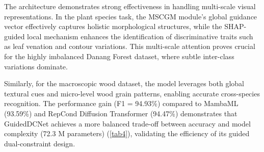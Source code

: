 \documentclass[a4paper,fleqn]{cas-sc}
\begin{document}
The architecture demonstrates strong effectiveness in handling multi-scale visual representations. In the plant species task, the MSCGM module’s global guidance vector effectively captures holistic morphological structures, while the SHAP-guided local mechanism enhances the identification of discriminative traits such as leaf venation and contour variations. This multi-scale attention proves crucial for the highly imbalanced Danang Forest dataset, where subtle inter-class variations dominate.

Similarly, for the macroscopic wood dataset, the model leverages both global textural cues and micro-level wood grain patterns, enabling accurate cross-species recognition. The performance gain (F1 = 94.93\%) compared to MambaML (93.59\%) and RepCond Diffusion Transformer (94.47\%) demonstrates that GuidedDCNet achieves a more balanced trade-off between accuracy and model complexity (72.3 M parameters) (\ref{tab4}), validating the efficiency of its guided dual-constraint design.
\end{document}
